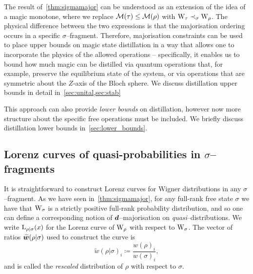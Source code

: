 \documentclass[pra,
aps,
twocolumn,
superscriptaddress,
groupedaddress,
nofootinbib,
reprint
]{revtex4-1}
\begin{document}
The result of~\cref{thm:sigmamajor} can be understood as an extension of the idea of a magic monotone, where we replace $\mathcal{M}(\tau) \leq \mathcal{M}(\rho)$ with $\W{\tau} \prec_\sigma \W{\rho}$. 
The physical difference between the two expressions is that the majorisation ordering occurs in a specific $\sigma$--fragment.
Therefore, majorisation constraints can be used to place upper bounds on magic state distillation in a way that allows one to incorporate the physics of the allowed operations -- specifically, it enables us to bound how much magic can be distilled via quantum operations that, for example, preserve the equilibrium state of the system, or via operations that are symmetric about the $Z$-axis of the Bloch sphere.
We discuss distillation upper bounds in detail in~\cref{sec:unital,sec:stab}

This approach can also provide \emph{lower bounds} on distillation, however now more structure about the specific free operations must be included. 
We briefly discuss distillation lower bounds in~\cref{sec:lower_bounds}.


\subsection{Lorenz curves of quasi-probabilities in $\sigma$--fragments}
\label{sec:lc}

It is straightforward to construct Lorenz curves for Wigner distributions in any $\sigma$--fragment.
As we have seen in~\cref{thm:sigmamajor}, for any full-rank free state $\sigma$ we have that $\W{\sigma}$ is a strictly positive full-rank probability distribution, and so one can define a corresponding notion of $\bm{d}$--majorisation on \emph{quasi}--distributions.
We write ${{\rm{L}}_{\rho|\sigma}}(x)$ for the Lorenz curve of $\W{\rho}$ with respect to $\W{\sigma}$.
The vector of ratios $\widetilde{\bm{w}}(\rho|\sigma)$ used to construct the curve is
\begin{equation}
	\widetilde{w}(\rho|\sigma)_i \coloneqq \frac{w(\rho)_i}{w(\sigma)_i},
\end{equation}
and is called the \emph{rescaled} distribution of $\rho$ with respect to $\sigma$.
\end{document}
